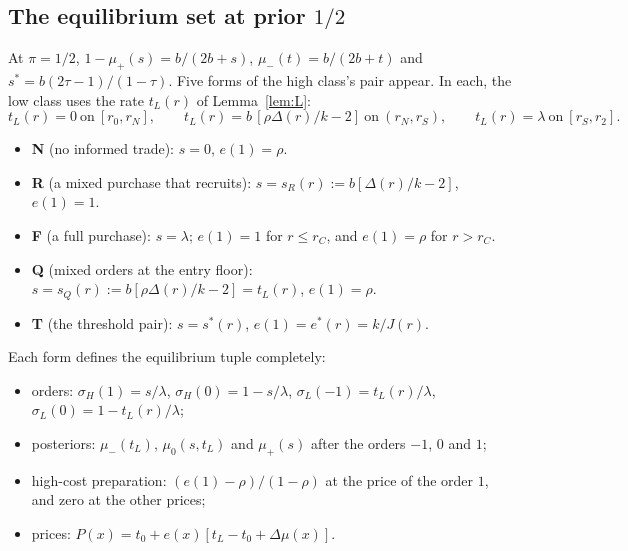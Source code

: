 \documentclass[11pt]{article}
\theoremstyle{definition}
\begin{document}
\subsection{The equilibrium set at prior $1/2$}

At $\pi=1/2$, $1-\mu_+(s)=b/(2b+s)$, $\mu_-(t)=b/(2b+t)$ and $s^*=b(2\tau-1)/(1-\tau)$. Five forms of the high
class's pair appear. In each, the low class uses the rate $t_L(r)$ of Lemma~\ref{lem:L}:
\[
t_L(r)=0\ \text{on}\ [r_0,r_N],\qquad t_L(r)=b\,[\rho\Delta(r)/k-2]\ \text{on}\ (r_N,r_S),\qquad t_L(r)=\lambda\ \text{on}\ [r_S,r_2].
\]
\begin{itemize}
\item \textbf{N} (no informed trade): $s=0$, $e(1)=\rho$.
\item \textbf{R} (a mixed purchase that recruits): $s=s_R(r):=b[\Delta(r)/k-2]$, $e(1)=1$.
\item \textbf{F} (a full purchase): $s=\lambda$; $e(1)=1$ for $r\le r_C$, and $e(1)=\rho$ for $r>r_C$.
\item \textbf{Q} (mixed orders at the entry floor): $s=s_Q(r):=b[\rho\Delta(r)/k-2]=t_L(r)$, $e(1)=\rho$.
\item \textbf{T} (the threshold pair): $s=s^*(r)$, $e(1)=e^*(r)=k/J(r)$.
\end{itemize}
Each form defines the equilibrium tuple completely:
\begin{itemize}
\item orders: $\sigma_H(1)=s/\lambda$, $\sigma_H(0)=1-s/\lambda$, $\sigma_L(-1)=t_L(r)/\lambda$, $\sigma_L(0)=1-t_L(r)/\lambda$;
\item posteriors: $\mu_-(t_L)$, $\mu_0(s,t_L)$ and $\mu_+(s)$ after the orders $-1$, $0$ and $1$;
\item high-cost preparation: $(e(1)-\rho)/(1-\rho)$ at the price of the order $1$, and zero at the other prices;
\item prices: $P(x)=t_0+e(x)[t_L-t_0+\Delta\mu(x)]$.
\end{itemize}
\end{document}
